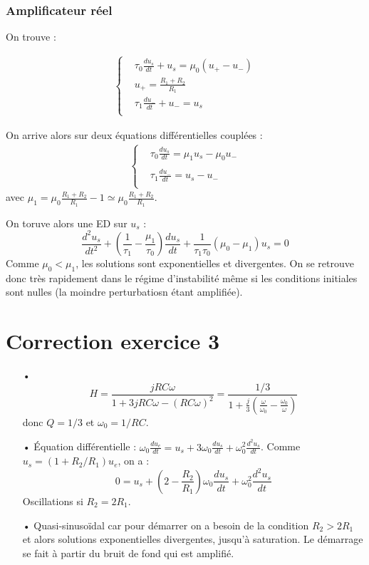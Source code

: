 \documentclass{report}
\begin{document}
\subsubsection{Amplificateur réel}

On trouve :

\begin{align*}
	\left\lbrace
\begin{array}{cc}
	& \tau_0\frac{du_s}{dt} +u_s = \mu_0(u_+-u_-) \\
	&  u_+=\frac{R_1+R_2}{R_1}\\
	&\tau_1\frac{du_-}{dt} +u_- =u_s  \\
\end{array}\right.
\end{align*}

On arrive alors sur deux équations différentielles couplées :
\begin{align*}
	\left\lbrace
\begin{array}{cc}
	& \tau_0\frac{du_s}{dt} = \mu_1u_s - \mu_0u_- \\
	&  \\
	&\tau_1\frac{du_-}{dt} = u_s - u_-  \\
\end{array}\right.
\end{align*}
avec $\mu_1=\mu_0\frac{R_1+R_2}{R_1}-1\simeq\mu_0\frac{R_1+R_2}{R_1}$.

On toruve alors une ED sur $u_s$ :
\begin{equation}
	\frac{d^2u_s}{dt^2} +\left( \frac{1}{\tau_1}-\frac{\mu_1}{\tau_0}\right) \frac{du_s}{dt} + \frac{1}{\tau_1\tau_0}\left(\mu_0-\mu_1\right)u_s=0
\end{equation}
Comme $\mu_0<\mu_1$, les solutions sont exponentielles et divergentes. On se retrouve donc très rapidement dans le régime d'instabilité même si les conditions initiales sont nulles (la moindre perturbatiosn étant amplifiée).
\section*{Correction exercice 3}

\begin{itemize}
	\item[•]
	\begin{equation}
		H=\frac{jRC\omega}{1+3jRC\omega-(RC\omega)^2}=\frac{1/3}{1+\frac{j}{3}\left( \frac{\omega}{\omega_0}-\frac{\omega_0}{\omega}\right) }
	\end{equation}
	donc $Q=1/3$ et $\omega_0=1/RC$.
	\item[•] Équation différentielle : $\omega_0\frac{du_e}{dt}=u_s+3\omega_0\frac{du_s}{dt}+\omega_0^2\frac{d^2u_s}{dt}$. Comme $u_s = (1+R_2/R_1)u_e$, on a :
	\begin{equation}
	0=u_s+\left( 2-\frac{R_2}{R_1}\right) \omega_0\frac{du_s}{dt}+\omega_0^2\frac{d^2u_s}{dt}
	\end{equation}
	Oscillations si $R_2=2R_1$.
	\item[•] Quasi-sinusoïdal car pour démarrer on a besoin de la condition $R_2>2R_1$ et alors solutions exponentielles divergentes, jusqu'à saturation. Le démarrage se fait à partir du bruit de fond qui est amplifié. 
\end{itemize}
\end{document}
